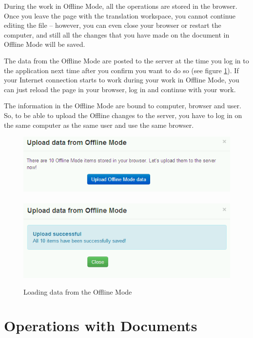 During the work in Offline Mode, all the operations are stored in the browser. Once you leave the page with the translation workspace, you cannot continue editing the file -- however, you can even close your browser or restart the computer, and still all the changes that you have made on the document in Offline Mode will be saved.

The data from the Offline Mode are posted to the server at the time you log in to the application next time after you confirm you want to do so (see figure \ref{fig:offline_loading}). If your Internet connection starts to work during your work in Offline Mode, you can just reload the page in your browser, log in and continue with your work.

The information in the Offline Mode are bound to computer, browser and user. So, to be able to upload the Offline changes to the server, you have to log in on the same computer as the same user and use the same browser.

\begin{figure}[h]
\begin{center}
\includegraphics[scale=0.4]{figures/user_manual/upload_offline_mode.png}~~~~
\includegraphics[scale=0.4]{figures/user_manual/upload_offline_mode_success.png}
\end{center}
\caption{Loading data from the Offline Mode}
\label{fig:offline_loading}
\end{figure}

\section{Operations with Documents}

